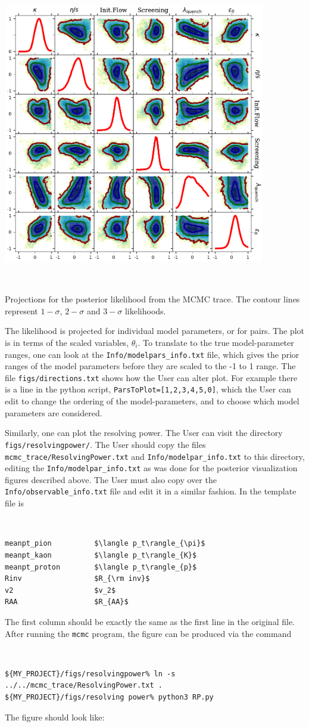 \documentclass[UserManual.tex]{subfiles}
\begin{document}
\parbox{4.5in}{\centerline{\includegraphics[width=4.5in]{posterior_rhic.pdf}}}
~~\parbox{2.0in}{Projections for the posterior likelihood from the MCMC trace. The contour lines represent $1-\sigma$, $2-\sigma$ and $3-\sigma$ likelihoods.}

The likelihood is projected for individual model parameters, or for pairs. The plot is in terms of the scaled variables, $\theta_i$. To translate to the true model-parameter ranges, one can look at the {\tt Info/modelpars\_info.txt} file, which gives the prior ranges of the model parameters before they are scaled to the -1 to 1 range. The file {\tt figs/directions.txt} shows how the User can alter plot. For example there is a line in the python script, {\tt ParsToPlot=[1,2,3,4,5,0]}, which the User can edit to change the ordering of the model-parameters, and to choose which model parameters are considered.

Similarly, one can plot the resolving power. The User can visit the directory {\tt figs/resolvingpower/}. The User should copy the files {\tt mcmc\_trace/ResolvingPower.txt} and {\tt Info/modelpar\_info.txt} to this directory, editing the {\tt Info/modelpar\_info.txt} as was done for the posterior visualization figures described above. The User must also copy over the {\tt Info/observable\_info.txt} file and edit it in a similar fashion. In the template file is
{\tt
\begin{verbatim}
meanpt_pion          $\langle p_t\rangle_{\pi}$
meanpt_kaon          $\langle p_t\rangle_{K}$
meanpt_proton        $\langle p_t\rangle_{p}$
Rinv                 $R_{\rm inv}$
v2                   $v_2$
RAA                  $R_{AA}$
\end{verbatim}}
The first column should be exactly the same as the first line in the original file. After running the {\tt mcmc} program, the figure can be produced via the command
{\tt
\begin{verbatim}
${MY_PROJECT}/figs/resolvingpower% ln -s ../../mcmc_trace/ResolvingPower.txt .
${MY_PROJECT}/figs/resolving power% python3 RP.py
\end{verbatim}}
The figure should look like:
\end{document}
